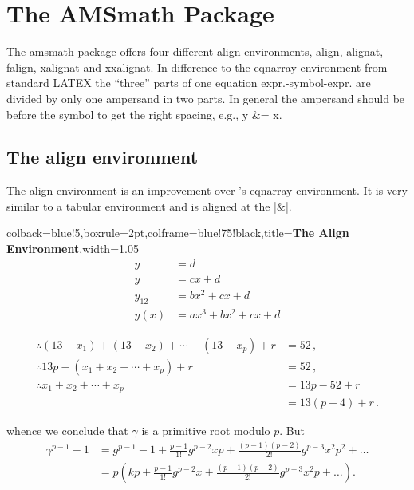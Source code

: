 \section{The AMSmath Package}

The amsmath package offers four different align environments, align, alignat, falign, xalignat and xxalignat. In difference to the eqnarray environment from standard LATEX the ``three'' parts of one equation expr.-symbol-expr. are divided by only one
ampersand in two parts. In general the ampersand should be before the symbol
to get the right spacing, e.g., y \&= x. 

\subsection{The align environment}

The align environment is an improvement over \latex's eqnarray environment. It is very similar to a tabular
environment and is aligned at the |&|.

\begin{tcblisting}{colback=blue!5,boxrule=2pt,colframe=blue!75!black,title=\textbf{The Align Environment},width=1.05\textwidth}
\begin{align}
         y & =d\label{eq:IntoSection}\\
         y & =cx+d\\
 y_{12} & =bx^{2}+cx+d\\
     y(x) & =ax^{3}+bx^{2}+cx+d
 \end{align}

\begin{align*}
\therefore (13 - x_1) + (13 - x_2) + \dotsb + (13 - x_p) + r &= 52\,,\\
\therefore 13p - (x_1 + x_2 + \dotsb + x_p) + r              &= 52\,,\\
\therefore x_1 + x_2 + \dotsb + x_p                          &= 13p - 52 + r\\
                                                          &= 13 (p - 4) + r\,.
\end{align*}

whence we conclude that $\gamma$ is a primitive root modulo $p$. But
\begin{align*}
\gamma^{p-1}-1 &=
     g^{p-1} - 1 + \frac{p-1}{1!}g^{p-2}xp +
        \frac{(p-1)(p-2)}{2!}g^{p-3}x^2p^2 + \ldots \\
  &= p\left(kp + \frac{p-1}{1!}g^{p-2}x +
        \frac{(p-1)(p-2)}{2!}g^{p-3}x^2p + \ldots\right).
\end{align*}
\end{tcblisting}

